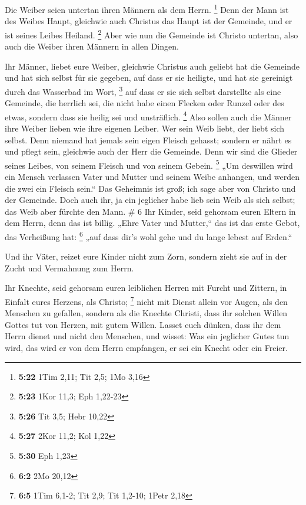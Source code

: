  Die Weiber seien untertan ihren Männern als dem Herrn.
\footnote{\textbf{5:22} 1Tim 2,11; Tit 2,5; 1Mo 3,16} 
Denn der Mann ist des Weibes Haupt, gleichwie auch Christus das Haupt
ist der Gemeinde, und er ist seines Leibes Heiland. \footnote{\textbf{5:23}
  1Kor 11,3; Eph 1,22-23}  Aber wie nun die Gemeinde ist
Christo untertan, also auch die Weiber ihren Männern in allen Dingen.

 Ihr Männer, liebet eure Weiber, gleichwie Christus auch
geliebt hat die Gemeinde und hat sich selbst für sie gegeben,
 auf dass er sie heiligte, und hat sie gereinigt durch
das Wasserbad im Wort, \footnote{\textbf{5:26} Tit 3,5; Hebr 10,22}
 auf dass er sie sich selbst darstellte als eine
Gemeinde, die herrlich sei, die nicht habe einen Flecken oder Runzel
oder des etwas, sondern dass sie heilig sei und unsträflich. \footnote{\textbf{5:27}
  2Kor 11,2; Kol 1,22}  Also sollen auch die Männer ihre
Weiber lieben wie ihre eigenen Leiber. Wer sein Weib liebt, der liebt
sich selbst.  Denn niemand hat jemals sein eigen Fleisch
gehasst; sondern er nährt es und pflegt sein, gleichwie auch der Herr
die Gemeinde.  Denn wir sind die Glieder seines Leibes,
von seinem Fleisch und von seinem Gebein. \footnote{\textbf{5:30} Eph
  1,23}  „Um deswillen wird ein Mensch verlassen Vater
und Mutter und seinem Weibe anhangen, und werden die zwei ein Fleisch
sein.``  Das Geheimnis ist groß; ich sage aber von
Christo und der Gemeinde.  Doch auch ihr, ja ein
jeglicher habe lieb sein Weib als sich selbst; das Weib aber fürchte den
Mann. \# 6  Ihr Kinder, seid gehorsam euren Eltern in dem
Herrn, denn das ist billig.  „Ehre Vater und Mutter,`` das
ist das erste Gebot, das Verheißung hat: \footnote{\textbf{6:2} 2Mo
  20,12}  „auf dass dir's wohl gehe und du lange lebest
auf Erden.``

 Und ihr Väter, reizet eure Kinder nicht zum Zorn, sondern
zieht sie auf in der Zucht und Vermahnung zum Herrn.

 Ihr Knechte, seid gehorsam euren leiblichen Herren mit
Furcht und Zittern, in Einfalt eures Herzens, als Christo; \footnote{\textbf{6:5}
  1Tim 6,1-2; Tit 2,9; Tit 1,2-10; 1Petr 2,18}  nicht mit
Dienst allein vor Augen, als den Menschen zu gefallen, sondern als die
Knechte Christi, dass ihr solchen Willen Gottes tut von Herzen, mit
gutem Willen.  Lasset euch dünken, dass ihr dem Herrn
dienet und nicht den Menschen,  und wisset: Was ein
jeglicher Gutes tun wird, das wird er von dem Herrn empfangen, er sei
ein Knecht oder ein Freier.

